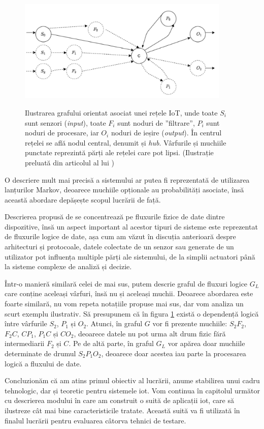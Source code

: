 \begin{figure}[h]
    \centering
    \caption{\centering Ilustrarea grafului orientat asociat unei rețele IoT, unde toate $S_i$ sunt senzori (\textit{input}), toate $F_i$ sunt noduri de ”filtrare”, $P_i$ sunt noduri de procesare, iar $O_i$ noduri de ieșire (\textit{output}). În centrul rețelei se află nodul central, denumit și \textit{hub}. Vârfurile și muchiile punctate reprezintă părți ale rețelei care pot lipsi. \newline (Ilustrație preluată din articolul  al lui \citet{Paduraru2021})}
    \includegraphics[width=0.9\textwidth]{images/river_topologie.png}
    \label{fig:river_network}
\end{figure}

O descriere mult mai precisă a sistemului ar putea fi reprezentată de utilizarea lanțurilor Markov, deoarece muchiile opționale au probabilități asociate, însă această abordare depășește scopul lucrării de față.

Descrierea propusă de \citet{Paduraru2021} se concentrează pe fluxurile fizice de date dintre dispozitive, însă un aspect important al acestor tipuri de sisteme este reprezentat de fluxurile logice de date, așa cum am văzut în discuția anterioară despre arhitecturi și protocoale, datele colectate de un senzor sau generate de un utilizator pot influența multiple părți ale sistemului, de la simplii actuatori până la sisteme complexe de analiză și decizie.

Într-o manieră similară celei de mai sus, putem descrie graful de fluxuri logice $G_L$ care conține aceleași vârfuri, însă nu și aceleași muchii. Deoarece abordarea este foarte similară, nu vom repeta notațiile propuse mai sus, dar vom analiza un scurt exemplu ilustrativ. Să presupunem că în figura \ref{fig:river_network} există o dependență logică între vârfurile $S_2$, $P_1$ și $O_2$. Atunci, în graful $G$ vor fi prezente muchiile: $S_2 F_2$, $F_2 C$, $C P_1$, $P_1 C$ și $C O_2$, deoarece datele nu pot urma alt drum fizic fără intermediarii $F_2$ și $C$. Pe de altă parte, în graful $G_L$ vor apărea doar muchiile determinate de drumul $S_2 P_1 O_2$, deoarece doar acestea iau parte la procesarea logică a fluxului de date.

Concluzionăm că am atins primul obiectiv al lucrării, anume stabilirea unui cadru tehnologic, dar și teoretic pentru sistemele \acrshort{iot}. Vom continua în capitolul următor cu descrierea modului în care am construit o suită de aplicații \acrshort{iot}, care să ilustreze cât mai bine caracteristicile tratate. Această suită va fi utilizată în finalul lucrării pentru evaluarea câtorva tehnici de testare.